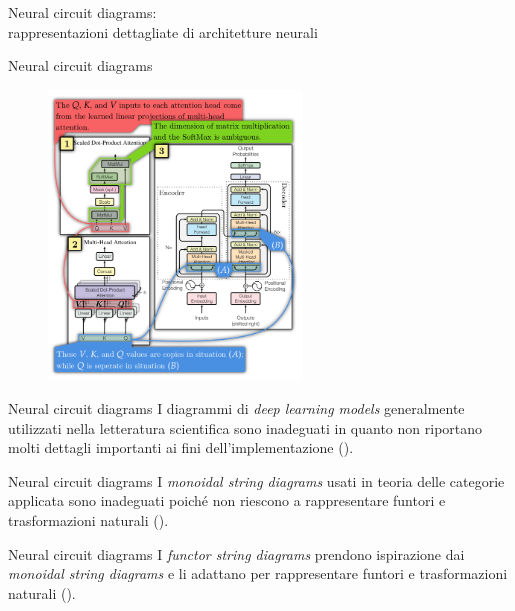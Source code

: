 \documentclass{beamer}
\begin{document}
\begin{frame}[standout]
    \huge Neural circuit diagrams: \\\large rappresentazioni dettagliate di architetture neurali
\end{frame}

\begin{frame}{Neural circuit diagrams}
    \begin{figure}
        \begin{center}
            \includegraphics[width=0.6\textwidth,angle=90]{figures/transformer_original.png}
            \caption*{\cite{abbott2024neural}}
        \end{center}
    \end{figure}
\end{frame}

\begin{frame}{Neural circuit diagrams}
    I diagrammi di \textit{deep learning models} generalmente utilizzati nella letteratura scientifica sono inadeguati in quanto non riportano molti dettagli importanti ai fini dell'implementazione (\cite{abbott2024neural,khatri2024anatomy}).
\end{frame}

\begin{frame}{Neural circuit diagrams}
    I \textit{monoidal string diagrams} usati in teoria delle categorie applicata sono inadeguati poiché non riescono a rappresentare funtori e trasformazioni naturali (\cite{abbott2024functor}).
\end{frame}

\begin{frame}{Neural circuit diagrams}
    I \textit{functor string diagrams} prendono ispirazione dai \textit{monoidal string diagrams} e li adattano per rappresentare funtori e trasformazioni naturali (\cite{abbott2024functor}).
\end{frame}
\end{document}
